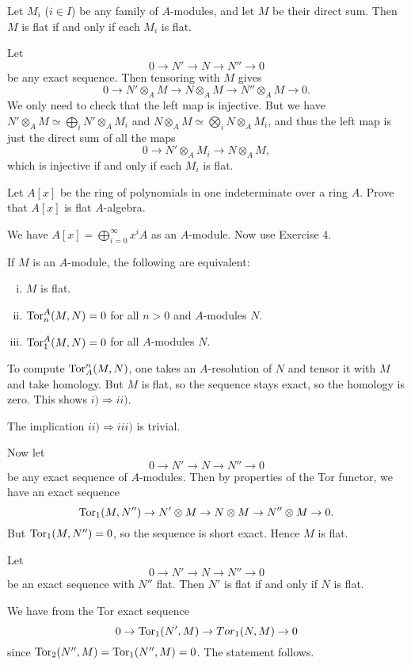 \documentclass[11pt, english]{article}
\begin{document}
\begin{exc}[Exercise 4]

Let $M_i$ ($i \in I$) be any family of $A$-modules, and let $M$ be their direct sum. Then $M$ is flat if and only if each $M_i$ is flat.  
\end{exc}
\begin{sol}
Let
\[
0 \to N' \to N \to N'' \to 0
\]
be any exact sequence. Then tensoring with $M$ gives
\[
0 \to N' \otimes_A M \to N \otimes_A M \to N'' \otimes_A M \to 0.
\]
We only need to check that the left map is injective. But we have $N' \otimes_A M \simeq \bigoplus_i N' \otimes_A M_i$ and $N \otimes_A M \simeq \bigotimes_i N \otimes_A M_i$, and thus the left map is just the direct sum of all the maps 
\[
0 \to N' \otimes_A M_i \to N \otimes_A M,
\]
which is injective if and only if each $M_i$ is flat.
\end{sol}

\begin{exc}[Exercise 5]
Let $A[x]$ be the ring of polynomials in one indeterminate over a ring $A$. Prove that $A[x]$ is flat $A$-algebra.  
\end{exc}
\begin{sol}
We have $A[x] = \bigoplus_{i=0}^\infty x^i A$ as an $A$-module. Now use Exercise 4.
\end{sol}

\begin{exc}[Exercise 24]
If $M$ is an $A$-module, the following are equivalent:
  \begin{enumerate}[i)]
  \item $M$ is flat.
\item $\operatorname{\mathrm{Tor}}_n^A(M,N)=0$ for all $n>0$ and $A$-modules $N$.
\item $\operatorname{\mathrm{Tor}}_1^A(M,N)=0$ for all $A$-modules $N$.
  \end{enumerate}
  \begin{sol}

To compute $\operatorname{\mathrm{Tor}}_A^n(M,N)$, one takes an $A$-resolution of $N$ and tensor it with $M$ and take homology. But $M$ is flat, so the sequence stays exact, so the homology is zero. This shows $i) \Rightarrow ii)$.

The implication $ii) \Rightarrow iii)$ is trivial.

Now let
\[
0 \to N' \to N \to N'' \to 0
\]
be any exact sequence of $A$-modules. Then by properties of the Tor functor, we have an exact sequence
\[
\operatorname{\mathrm{Tor}}_1(M,N'') \to N' \otimes M \to N \otimes M \to N'' \otimes M \to 0.
\]
But $\operatorname{\mathrm{Tor}}_1(M,N'')=0$, so the sequence is short exact. Hence $M$ is flat.
  \end{sol}

  \begin{exc}[Exercise 25]

Let 
\[
0 \to N' \to N \to N'' \to 0
\]
be an exact sequence with $N''$ flat. Then $N'$ is flat if and only if $N$ is flat.
  \end{exc}
  \begin{sol}
    We have from the Tor exact sequence
\[
0 \to \operatorname{\mathrm{Tor}}_1(N',M) \to Tor_1(N,M) \to 0
\]
since $\operatorname{\mathrm{Tor}}_2(N'',M)=\operatorname{\mathrm{Tor}}_1(N'',M)=0$. The statement follows.
  \end{sol}
  
\end{exc}
\end{document}
